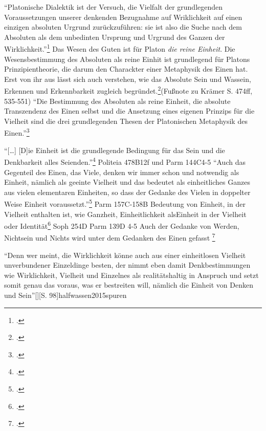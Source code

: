 \documentclass[12pt]{article}
\begin{document}
\enquote{Platonische Dialektik ist der Versuch, die Vielfalt der grundlegenden Voraussetzungen unserer denkenden Bezugnahme auf Wriklichkeit auf einen einzigen absoluten Urgrund zurückzuführen: sie ist also die Suche nach dem Absoluten als dem unbedinten Ursprung und Urgrund des Ganzen der Wirklichkeit.}\footcite[][S. 95]{halfwassen2015spuren}
Das Wesen des Guten ist für Platon \emph{die reine Einheit}. Die Wesensbestimmung des Absoluten als reine Einhit ist grundlegend für Platons Prinzipientheorie, die darum den Charackter einer Metaphysik des Einen hat. Erst von ihr aus lässt sich auch verstehen, wie das Absolute Sein und Wassein, Erkennen und Erkennbarkeit zugleich begründet.\footcite[][S. 96]{halfwassen2015spuren}(Fußnote zu Krämer S. 474ff, 535-551)
\enquote{Die Bestimmung des Absoluten als reine Einheit, die absolute Transzendenz des Einen selbst und die Ansetzung eines eigenen Prinzips für die Vielheit sind die drei grundlegenden Thesen der Platonischen Metaphysik des Einen.}\footcite[][S. 96]{halfwassen2015spuren}

\enquote{[\dots] [D]ie Einheit ist die grundlegende Bedingung für das Sein und die Denkbarkeit alles Seienden.}\footcite[vgl.][S. 97]{halfwassen2015spuren} Politeia 478B12f und Parm 144C4-5
\enquote{Auch das Gegenteil des Einen, das Viele, denken wir immer schon und notwendig als Einheit, nämlich als geeinte Vielheit und das bedeutet als einheitliches Ganzes aus vielen elementaren Einheiten, so dass der Gedanke des Vielen in doppelter Weise Einheit voraussetzt.}\footcite[][S. 97]{halfwassen2015spuren} Parm 157C-158B
Bedeutung von Einheit, in der Vielheit enthalten ist, wie Ganzheit, Einheitlichkeit alsEinheit in der Vielheit oder Identität\footcite[vgl.][S. 97]{halfwassen2015spuren} Soph 254D Parm 139D 4-5
Auch der Gedanke von Werden, Nichtsein und Nichts wird unter dem Gedanken des Einen gefasst \footcite[vgl.][S. 97]{halfwassen2015spuren}

\enquote{Denn wer meint, die Wirklichkeit könne auch aus einer einheitlosen Vielheit unverbundener Einzeldinge besten, der nimmt eben damit Denkbestimmungen wie Wirklichkeit, Vielheit und Einzelnes als realitätshaltig in Anspruch und setzt somit genau das voraus, was er bestreiten will, nämlich die Einheit von Denken und Sein}[][S. 98]{halfwassen2015spuren}
\end{document}
